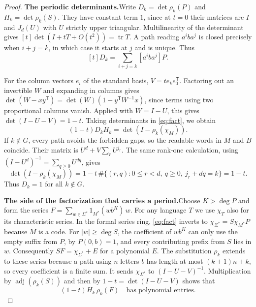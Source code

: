 \documentclass[11pt,a4paper]{article}
\newcommand{\head}[1]{\par\noindent\textbf{#1}\enspace}
\DeclareMathOperator{\tr}{tr}
\DeclareMathOperator{\adj}{adj}
\begin{document}
\begin{proof}
\head{The periodic determinants.}Write $D_k=\det\rho_k(P)$ and $H_k=\det\rho_k(S)$. They have
constant term $1$, since at $t=0$ their matrices are $I$ and $J_d(U)$ with $U$ strictly upper
triangular. Multilinearity of the determinant gives $[t]\det(I+tT+O(t^2))=\tr T$. A path reading
$a^iba^j$ is closed precisely when $i+j=k$, in which case it starts at $j$ and is unique. Thus
\begin{equation}\label{eq:trace}
  [t]D_k=\sum_{i+j=k}[a^iba^j]P.
\end{equation}

For the column vectors $e_i$ of the standard basis, $V=te_ke_0^{\mathsf T}$. Factoring out an
invertible $W$ and expanding in columns gives $\det(W-xy^{\mathsf T})=\det(W)(1-y^{\mathsf
T}W^{-1}x)$, since terms using two proportional columns vanish. Applied with $W=I-U$, this gives
$\det(I-U-V)=1-t$. Taking determinants in \eqref{eq:fact}, we obtain
\begin{equation}\label{eq:det}
  (1-t)D_kH_k=\det(I-\rho_k(\chi_M)).
\end{equation}
If $k\notin G$, every path avoids the forbidden gaps, so the readable words in $M$ and $B$
coincide. Their matrix is $U^d+V\sum_rU^{j_r}$. The same rank-one calculation, using
$(I-U^d)^{-1}=\sum_{q\ge0}U^{dq}$, gives
\[
  \det(I-\rho_k(\chi_M))=1-t\,\#\{(r,q):0\le r<d,\ q\ge0,\ j_r+dq=k\}=1-t.
\]
Thus $D_k=1$ for all $k\notin G$.

\head{The side of the factorization that carries a period.}Choose $K>\deg P$ and form the series
$F=\sum_{w\in\Sigma^*}1_{M^*}(wb^K)\,w$. For any language $T$ we use $\chi_T$ also for its
characteristic series. In the formal series ring, \eqref{eq:fact} inverts to
$\chi_{\Sigma^*}=S\chi_{M^*}P$ because $M$ is a code. For $|w|\ge\deg S$, the coefficient of
$wb^K$ can only use the empty suffix from $P$, by $P(0,b)=1$, and every contributing prefix from
$S$ lies in $w$. Consequently $SF=\chi_{\Sigma^*}+E$ for a polynomial $E$. The substitution
$\rho_k$ extends to these series because a path using $n$ letters $b$ has length at most
$(k+1)n+k$, so every coefficient is a finite sum. It sends $\chi_{\Sigma^*}$ to $(I-U-V)^{-1}$.
Multiplication by $\adj(\rho_k(S))$ and then by $1-t=\det(I-U-V)$ shows that
\begin{equation}\label{eq:poly}
  (1-t)H_k\,\rho_k(F)\quad\text{has polynomial entries.}
\end{equation}


\end{proof}
\end{document}
